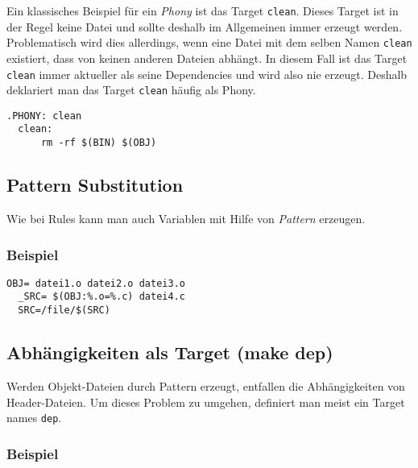 \documentclass{scrartcl}
\begin{document}
Ein klassisches Beispiel für ein \emph{Phony} ist das Target
\texttt{clean}. Dieses Target ist in der Regel keine Datei und sollte
deshalb im Allgemeinen immer erzeugt werden. Problematisch wird dies
allerdings, wenn eine Datei mit dem selben Namen \texttt{clean}
existiert, dass von keinen anderen Dateien abhängt. In diesem Fall ist
das Target \texttt{clean} immer aktueller als seine Dependencies und
wird also nie erzeugt. Deshalb deklariert man das Target
\texttt{clean} häufig als Phony.

\begin{lstlisting}[frame=single]
  .PHONY: clean
  clean:
      rm -rf $(BIN) $(OBJ)
\end{lstlisting}

\subsection{Pattern Substitution}
\label{sec:pattern-substitution}

Wie bei Rules kann man auch Variablen mit Hilfe von \emph{Pattern}
erzeugen.

\subsubsection{Beispiel}
\label{sec:beispiel-5}

\begin{lstlisting}[frame=single]
  OBJ= datei1.o datei2.o datei3.o
  _SRC= $(OBJ:%.o=%.c) datei4.c
  SRC=/file/$(SRC)
\end{lstlisting}

\subsection{Abhängigkeiten als Target (make dep)}
\label{sec:abhang-als-targ}

Werden Objekt-Dateien durch Pattern erzeugt, entfallen die
Abhängigkeiten von Header-Dateien. Um dieses Problem zu umgehen,
definiert man meist ein Target names \texttt{dep}.

\subsubsection{Beispiel}
\label{sec:beispiel-6}
\end{document}
